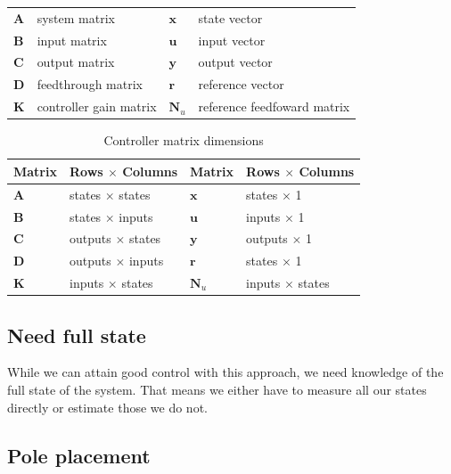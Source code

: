 \documentclass[10pt,conference,compsoc]{IEEEtran}
\newcommand{\mtx}[1] {\bm #1}
\begin{document}
\begin{table}[ht]
  \renewcommand{\arraystretch}{1.3}
  \centering
  \begin{tabulary}{\linewidth}{LLLL}
    $\mtx{A}$ & system matrix      & $\mtx{x}$ & state vector \\
    $\mtx{B}$ & input matrix       & $\mtx{u}$ & input vector \\
    $\mtx{C}$ & output matrix      & $\mtx{y}$ & output vector \\
    $\mtx{D}$ & feedthrough matrix & $\mtx{r}$ & \gls{reference} vector \\
    $\mtx{K}$ & controller gain matrix & $\mtx{N}_u$ & \gls{reference}
      feedfoward matrix \\
  \end{tabulary}
  \label{tab:ctrl_def}
\end{table}

\begin{table}[ht]
  \caption{Controller matrix dimensions}
  \renewcommand{\arraystretch}{1.5}
  \centering
  \begin{tabular}{|ll|ll|}
    \hline
    \textbf{Matrix} & \textbf{Rows $\times$ Columns} &
    \textbf{Matrix} & \textbf{Rows $\times$ Columns} \\
    \hline
    $\mtx{A}$ & states $\times$ states & $\mtx{x}$ & states $\times$ 1 \\
    $\mtx{B}$ & states $\times$ inputs & $\mtx{u}$ & inputs $\times$ 1 \\
    $\mtx{C}$ & outputs $\times$ states & $\mtx{y}$ & outputs $\times$ 1 \\
    $\mtx{D}$ & outputs $\times$ inputs & $\mtx{r}$ & states $\times$ 1 \\
    $\mtx{K}$ & inputs $\times$ states & $\mtx{N}_u$ & inputs $\times$ states \\
    \hline
  \end{tabular}
  \label{tab:ctrl_matrix_dims}
\end{table}

\subsection{Need full state}

While we can attain good control with this approach, we need knowledge of the
full state of the system. That means we either have to measure all our states
directly or estimate those we do not.

\subsection{Pole placement}
\end{document}
